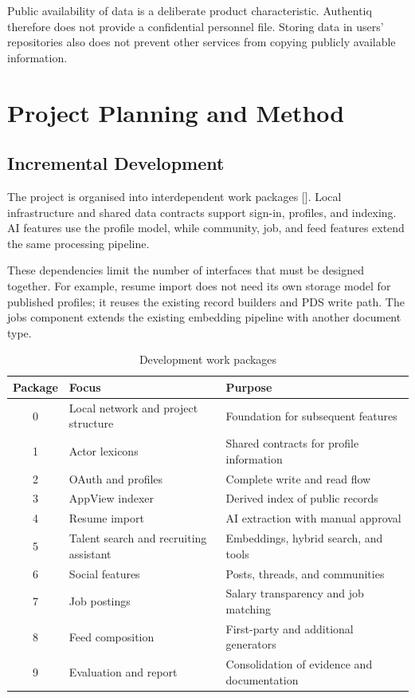 \documentclass[11pt,a4paper]{article}
\newcommand{\reflink}[1]{\hyperlink{ref:#1}{#1}}
\newcommand{\refsep}{}
\newcommand{\refs}[1]{\begingroup
  \gdef\refsep{}%
  \renewcommand*{\do}[1]{\refsep\reflink{##1}\gdef\refsep{, }}%
  [\docsvlist{#1}]\endgroup}
\begin{document}
Public availability of data is a deliberate product characteristic. Authentiq therefore does not provide a confidential personnel file. Storing data in users' repositories also does not prevent other services from copying publicly available information.

\section{Project Planning and Method}

\subsection{Incremental Development}

The project is organised into interdependent work packages \refs{P1}. Local infrastructure and shared data contracts support sign-in, profiles, and indexing. AI features use the profile model, while community, job, and feed features extend the same processing pipeline.

These dependencies limit the number of interfaces that must be designed together. For example, resume import does not need its own storage model for published profiles; it reuses the existing record builders and PDS write path. The jobs component extends the existing embedding pipeline with another document type.

\begin{table}[htbp]
\centering
\caption{Development work packages}
\label{tab:packages}
\begin{tabularx}{\textwidth}{@{}c>{\raggedright\arraybackslash}p{}Y@{}}
\toprule
\textbf{Package} & \textbf{Focus} & \textbf{Purpose} \\
 & Local network and project structure & Foundation for subsequent features \\
1 & Actor lexicons & Shared contracts for profile information \\
2 & OAuth and profiles & Complete write and read flow \\
3 & AppView indexer & Derived index of public records \\
4 & Resume import & AI extraction with manual approval \\
5 & Talent search and recruiting assistant & Embeddings, hybrid search, and tools \\
6 & Social features & Posts, threads, and communities \\
7 & Job postings & Salary transparency and job matching \\
8 & Feed composition & First-party and additional generators \\
9 & Evaluation and report & Consolidation of evidence and documentation \\
\bottomrule
\end{tabularx}
\end{table}
\end{document}
